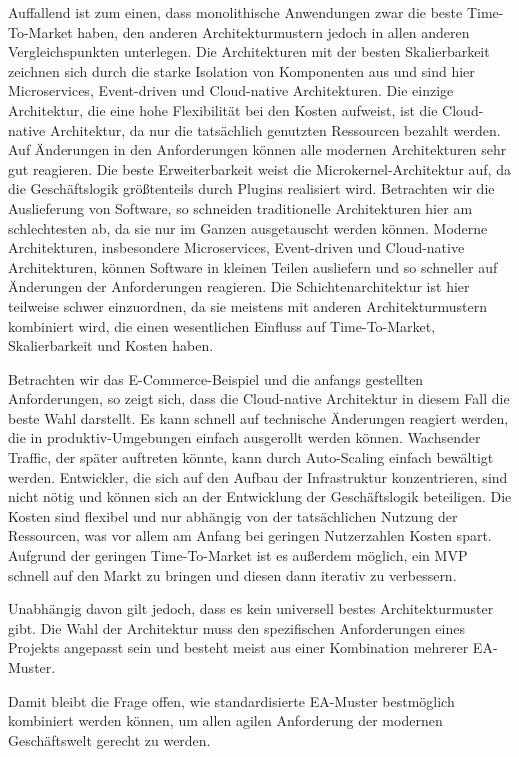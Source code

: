 \documentclass[acmtog]{acmart}
\begin{document}
Auffallend ist zum einen, dass monolithische Anwendungen zwar die beste Time-To-Market haben, den anderen Architekturmustern jedoch in allen anderen Vergleichspunkten unterlegen.
Die Architekturen mit der besten Skalierbarkeit zeichnen sich durch die starke Isolation von Komponenten aus und sind hier Microservices, Event-driven und Cloud-native Architekturen.
Die einzige Architektur, die eine hohe Flexibilität bei den Kosten aufweist, ist die Cloud-native Architektur, da nur die tatsächlich genutzten Ressourcen bezahlt werden.
Auf Änderungen in den Anforderungen können alle modernen Architekturen sehr gut reagieren.
Die beste Erweiterbarkeit weist die Microkernel-Architektur auf, da die Geschäftslogik größtenteils durch Plugins realisiert wird.
Betrachten wir die Auslieferung von Software, so schneiden traditionelle Architekturen hier am schlechtesten ab, da sie nur im Ganzen ausgetauscht werden können.
Moderne Architekturen, insbesondere Microservices, Event-driven und Cloud-native Architekturen, können Software in kleinen Teilen ausliefern und so schneller auf Änderungen der Anforderungen reagieren.
Die Schichtenarchitektur ist hier teilweise schwer einzuordnen, da sie meistens mit anderen Architekturmustern kombiniert wird, die einen wesentlichen Einfluss auf Time-To-Market, Skalierbarkeit und Kosten haben.

Betrachten wir das E-Commerce-Beispiel und die anfangs gestellten Anforderungen, so zeigt sich, dass die Cloud-native Architektur in diesem Fall die beste Wahl darstellt.
Es kann schnell auf technische Änderungen reagiert werden, die in produktiv-Umgebungen einfach ausgerollt werden können.
Wachsender Traffic, der später auftreten könnte, kann durch Auto-Scaling einfach bewältigt werden.
Entwickler, die sich auf den Aufbau der Infrastruktur konzentrieren, sind nicht nötig und können sich an der Entwicklung der Geschäftslogik beteiligen.
Die Kosten sind flexibel und nur abhängig von der tatsächlichen Nutzung der Ressourcen, was vor allem am Anfang bei geringen Nutzerzahlen Kosten spart.
Aufgrund der geringen Time-To-Market ist es außerdem möglich, ein MVP schnell auf den Markt zu bringen und diesen dann iterativ zu verbessern.

Unabhängig davon gilt jedoch, dass es kein universell bestes Architekturmuster gibt.
Die Wahl der Architektur muss den spezifischen Anforderungen eines Projekts angepasst sein und besteht meist aus einer Kombination mehrerer EA-Muster.

Damit bleibt die Frage offen, wie standardisierte EA-Muster bestmöglich kombiniert werden können, um allen agilen Anforderung der modernen Geschäftswelt gerecht zu werden.
\end{document}
